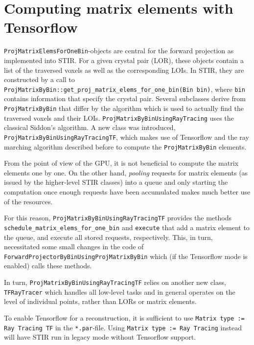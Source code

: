 \documentclass[a4paper, 11pt]{article}
\begin{document}
  \section{Computing matrix elements with Tensorflow}
  \texttt{ProjMatrixElemsForOneBin}-objects are central for the forward projection as implemented into STIR. For a given crystal pair (LOR), these objects contain a list of the traversed voxels as well as the corresponding LOIs. In STIR, they are constructed by a call to \texttt{ProjMatrixByBin::get\_proj\_matrix\-\_elems\_for\_one\_bin(Bin bin)}, where \texttt{bin} contains information that specify the crystal pair.
  Several subclasses derive from \texttt{ProjMatrixByBin} that differ by the algorithm which is used to actually find the traversed voxels and their LOIs. \texttt{ProjMatrixByBinUsingRayTracing} uses the classical Siddon's algorithm. A new class was introduced, \texttt{ProjMatrixByBinUsingRayTracingTF}, which makes use of Tensorflow and the ray marching algorithm described before to compute the \texttt{ProjMatrixByBin} elements.

  From the point of view of the GPU, it is not beneficial to compute the matrix elements one by one. On the other hand, \textsl{pooling} requests for matrix elements (as issued by the higher-level STIR classes) into a queue and only starting the computation once enough requests have been accumulated makes much better use of the resources.

  For this reason, \texttt{ProjMatrixByBinUsingRayTracingTF} provides the methods \texttt{schedule\_matrix\-\_elems\_for\_one\_bin} and \texttt{execute} that add a matrix element to the queue, and execute all stored requests, respectively. This, in turn, necessitated some small changes in the code of \texttt{ForwardProjector\-ByBinUsingProjMatrixByBin} which (if the Tensorflow mode is enabled) calls these methods.

  In turn, \texttt{ProjMatrixByBinUsingRayTracingTF} relies on another new class, \texttt{TFRayTracer} which handles all low-level tasks and in general operates on the level of individual points, rather than LORs or matrix elements.

  To enable Tensorflow for a reconstruction, it is sufficient to use \texttt{Matrix type := Ray Tracing TF} in the \texttt{*.par}-file. Using \texttt{Matrix type := Ray Tracing} instead will have STIR run in legacy mode without Tensorflow support.
\end{document}
